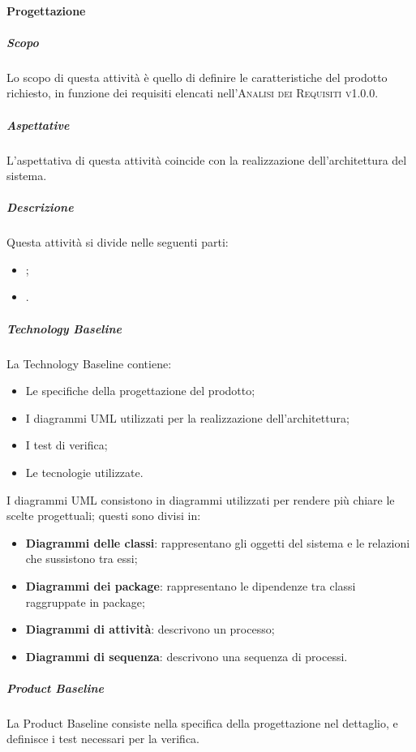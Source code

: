 \documentclass[../norme-di-progetto.tex]{subfiles}
\begin{document}
\paragraph{Progettazione}
\subparagraph{Scopo}
Lo scopo di questa attività è quello di definire le caratteristiche del prodotto richiesto, in funzione dei requisiti elencati nell'\textsc{Analisi dei Requisiti v1.0.0}.
\subparagraph{Aspettative}
L'aspettativa di questa attività coincide con la realizzazione dell'architettura del sistema.
\subparagraph{Descrizione}
Questa attività si divide nelle seguenti parti:
\begin{itemize}
  \item \textbf{};
  \item \textbf{}.
\end{itemize}
\subparagraph*{Technology Baseline}
La Technology Baseline contiene:
\begin{itemize}
  \item Le specifiche della progettazione del prodotto;
  \item I diagrammi UML utilizzati per la realizzazione dell'architettura;
  \item I test di verifica;
  \item Le tecnologie utilizzate.
\end{itemize}
I diagrammi UML consistono in diagrammi utilizzati per rendere più chiare le scelte progettuali; questi sono divisi in:
\begin{itemize}
  \item \textbf{Diagrammi delle classi}: rappresentano gli oggetti del sistema e le relazioni che sussistono tra essi;
  \item \textbf{Diagrammi dei package}: rappresentano le dipendenze tra classi raggruppate in package;
  \item \textbf{Diagrammi di attività}: descrivono un processo;
  \item \textbf{Diagrammi di sequenza}: descrivono una sequenza di processi.
\end{itemize}

\subparagraph*{Product Baseline}
La Product Baseline consiste nella specifica della progettazione nel dettaglio, e definisce i test necessari per la verifica.
\end{document}
